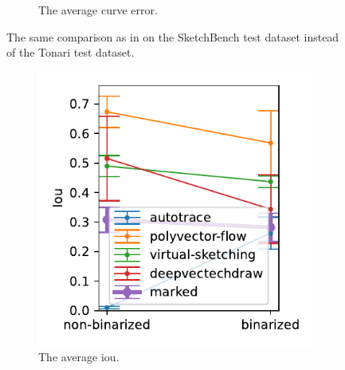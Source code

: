\begin{figure}[h]
\begin{subfigure}{.3\textwidth}
    \caption{The average curve error.}
\end{subfigure}
    \caption{The same comparison as in  on the SketchBench test dataset instead of the Tonari test dataset.}
    \label{fig:metric_1024_True_sketchbench}
\end{figure}

\begin{figure}[h]
    \centering
    \begin{subfigure}{.3\textwidth}
    \centering
    \includegraphics[width=\textwidth]{graphics/eval/iou_True_1024-1.024_tonari.pdf}
    \caption{The average \gls{iou}.}
\end{subfigure}
    \begin{subfigure}{.3\textwidth}
    \centering

\end{subfigure}
\end{figure}
